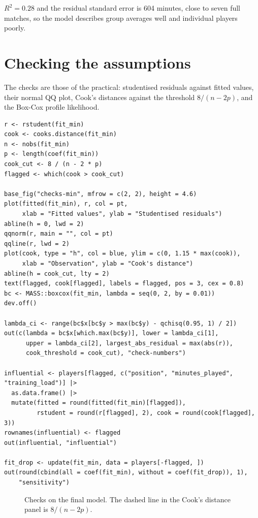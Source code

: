 \documentclass[12pt,notitlepage]{report}
\begin{document}
$R^2 = 0.28$ and the residual standard error is 604 minutes, close to seven
full matches, so the model describes group averages well and individual
players poorly.

\section{Checking the assumptions}

The checks are those of the practical: studentised residuals against fitted
values, their normal QQ plot, Cook's distances against the threshold
$8/(n - 2p)$, and the Box-Cox profile likelihood.

\begin{verbatim}
r <- rstudent(fit_min)
cook <- cooks.distance(fit_min)
n <- nobs(fit_min)
p <- length(coef(fit_min))
cook_cut <- 8 / (n - 2 * p)
flagged <- which(cook > cook_cut)

base_fig("checks-min", mfrow = c(2, 2), height = 4.6)
plot(fitted(fit_min), r, col = pt,
     xlab = "Fitted values", ylab = "Studentised residuals")
abline(h = 0, lwd = 2)
qqnorm(r, main = "", col = pt)
qqline(r, lwd = 2)
plot(cook, type = "h", col = blue, ylim = c(0, 1.15 * max(cook)),
     xlab = "Observation", ylab = "Cook's distance")
abline(h = cook_cut, lty = 2)
text(flagged, cook[flagged], labels = flagged, pos = 3, cex = 0.8)
bc <- MASS::boxcox(fit_min, lambda = seq(0, 2, by = 0.01))
dev.off()

lambda_ci <- range(bc$x[bc$y > max(bc$y) - qchisq(0.95, 1) / 2])
out(c(lambda = bc$x[which.max(bc$y)], lower = lambda_ci[1],
      upper = lambda_ci[2], largest_abs_residual = max(abs(r)),
      cook_threshold = cook_cut), "check-numbers")

influential <- players[flagged, c("position", "minutes_played", "training_load")] |>
  as.data.frame() |>
  mutate(fitted = round(fitted(fit_min)[flagged]),
         rstudent = round(r[flagged], 2), cook = round(cook[flagged], 3))
rownames(influential) <- flagged
out(influential, "influential")

fit_drop <- update(fit_min, data = players[-flagged, ])
out(round(cbind(all = coef(fit_min), without = coef(fit_drop)), 1),
    "sensitivity")
\end{verbatim}

\begin{figure}[H]
  \centering
  \caption{Checks on the final model. The dashed line in the Cook's distance
    panel is $8/(n - 2p)$.}
  \label{fig:checks}
\end{figure}
\end{document}

